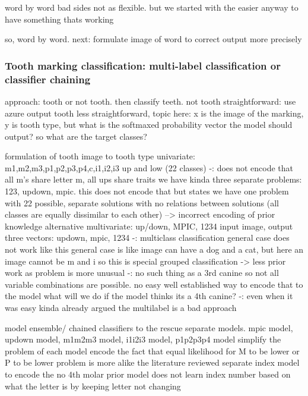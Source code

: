 \documentclass{article}
\begin{document}
word by word bad sides
    not as flexible. but we started with the easier anyway to have something thats working

so, word by word. next: formulate image of word to correct output more precisely

\subsubsection{Tooth marking classification: multi-label classification or classifier chaining}

approach: tooth or not tooth. then classify teeth. 
not tooth straightforward: use azure output
tooth less straightforward, topic here: x is the image of the marking, y is tooth type, but what is the 
softmaxed probability vector the model should output? so what are the target classes?

formulation of tooth image to tooth type
    univariate: m1,m2,m3,p1,p2,p3,p4,c,i1,i2,i3 up and low (22 classes)
        -: does not encode that all m's share letter m, all ups share traits
        we have kinda three separate problems: 123, updown, mpic. this does not encode that 
        but states we have one problem with 22 possible, separate solutions with no relations between solutions
            (all classes are equally dissimilar to each other) --> incorrect encoding of prior knowledge
    alternative multivariate: up/down, MPIC, 1234
        input image, output three vectors: updown, mpic, 1234
            -: multiclass classification general case does not work like this 
                general case is like image can have a dog and a cat, but here an image cannot be m and i \cite{multilabel_classification}
                    so this is special grouped classification -> less prior work as problem is more unusual 
            -: no such thing as a 3rd canine 
                so not all variable combinations are possible. no easy well established way to encode that to the model 
                    what will we do if the model thinks its a 4th canine?
            -: even when it was easy \cite{tibetan_ocr} kinda already argued the multilabel is a bad approach

    model ensemble/ chained classifiers to the rescue
        separate models. mpic model, updown model, m1m2m3 model, i1i2i3 model, p1p2p3p4 model
            simplify the problem of each model
            encode the fact that equal likelihood for M to be lower or P to be lower
            problem is more alike the literature reviewed
            separate index model to encode
                the no 4th molar prior
                model does not learn index number based on what the letter is by keeping letter not changing
\end{document}
